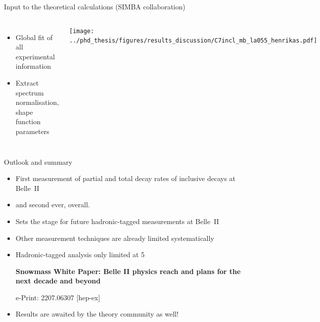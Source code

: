 \documentclass[xcolor=dvipsnames]{beamer}
\begin{document}
\begin{frame}{Input to the theoretical calculations (SIMBA collaboration)}
\begin{columns}
   \centering
   \begin{itemize}
      \item Global fit of all experimental information
      \item Extract spectrum normalisation, shape function parameters
   \end{itemize}
   \texttt{[image: ../phd\_thesis/figures/results\_discussion/C7incl\_mb\_la055\_henrikas.pdf]}

\end{columns}


\end{frame}   

\begin{frame}{Outlook and summary}
\scriptsize\centering
   \begin{itemize}
      \item First measurement of partial and total decay rates of inclusive \BtoXsgamma decays at Belle~II
      \item[] and second ever, overall.
      \item Sets the stage for future hadronic-tagged \BtoXsgamma measurements at Belle~II
      \item Other measurement techniques are already limited systematically\\
      \item Hadronic-tagged analysis only limited at 5~\invab\\
      \begin{flushright}
         \tiny
         \textbf{Snowmass White Paper: Belle II physics reach and plans for the next decade and beyond}
      
      e-Print: 2207.06307 [hep-ex]
      \end{flushright}
      \item Results are awaited by the theory community as well!
   \end{itemize}




\end{frame}

\appendix

\end{document}
